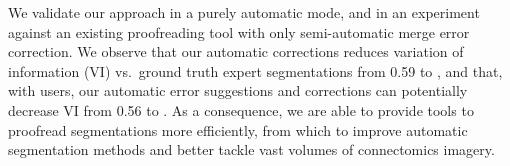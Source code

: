 We validate our approach in a purely automatic mode, and in an experiment against an existing proofreading tool with only semi-automatic merge error correction\cite{haehn_dojo_2014}. We observe that our automatic corrections reduces variation of information (VI) vs.~ground truth expert segmentations from 0.59 to , and that, with users, our automatic error suggestions and corrections can potentially decrease VI from 0.56 to . As a consequence, we are able to provide tools to proofread segmentations more efficiently, from which to improve automatic segmentation methods and better tackle vast volumes of connectomics imagery.

%
%

